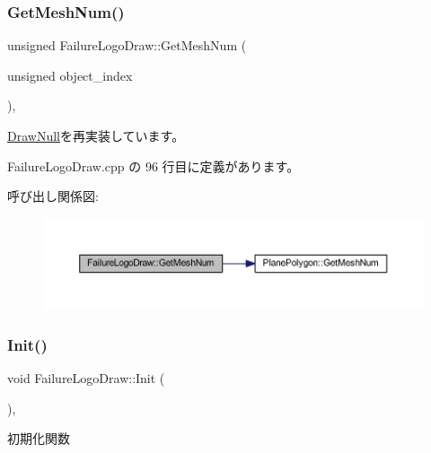 \subsubsection{\texorpdfstring{Get\+Mesh\+Num()}{GetMeshNum()}}
{\footnotesize\ttfamily unsigned Failure\+Logo\+Draw\+::\+Get\+Mesh\+Num (\begin{DoxyParamCaption}\item[{unsigned}]{object\+\_\+index }\end{DoxyParamCaption})\hspace{0.3cm}{\ttfamily [override]}, {\ttfamily [virtual]}}



\mbox{\hyperlink{class_draw_null_ad735978a85a5f3583eecd82d6bfe6413}{Draw\+Null}}を再実装しています。



 Failure\+Logo\+Draw.\+cpp の 96 行目に定義があります。

呼び出し関係図\+:\nopagebreak
\begin{figure}[H]
\begin{center}
\leavevmode
\includegraphics[width=350pt]{class_failure_logo_draw_aa7164b6f5788416788482893aa747d59_cgraph}
\end{center}
\end{figure}
\mbox{\label{class_failure_logo_draw_a718d587edcabb1feea72153a79a65176}} 
\subsubsection{\texorpdfstring{Init()}{Init()}}
{\footnotesize\ttfamily void Failure\+Logo\+Draw\+::\+Init (\begin{DoxyParamCaption}{ }\end{DoxyParamCaption})\hspace{0.3cm}{\ttfamily [override]}, {\ttfamily [virtual]}}



初期化関数 



